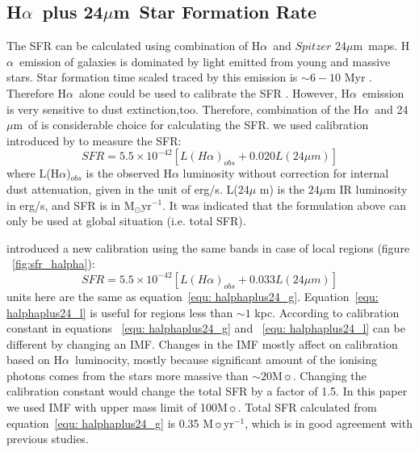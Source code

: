 \documentclass[useAMS,usenatbib]{mn2e}
\newcommand \halpha    {H$\alpha $\ }
\newcommand \um    {$\mu$m\ }
\begin{document}
\subsection{\halpha plus 24\um Star Formation Rate}
\label{sec:sfr_halpha}

The SFR can be calculated using combination of \halpha and $Spitzer$ 24\um maps. \halpha emission of galaxies is dominated by light emitted from young and massive stars. Star formation time scaled traced by this emission is $\sim 6-10$ Myr \citep[e.g.,][]{Kennicutt09, Calzetti12}. Therefore \halpha alone could be used to calibrate the SFR \citep[e.g.,][]{Osterbrock06, Kennicutt09}. However, \halpha emission is very sensitive to dust extinction,too. Therefore, combination of the \halpha and 24\um of is considerable choice for calculating the SFR. we used calibration introduced by \cite{Kennicutt09} to measure the SFR:
\begin{equation}
\label{equ: halphaplus24_g}
SFR = 5.5 \times 10^{-42}[L(H{\alpha})_{obs} + 0.020L(24\mu m)]
\end{equation}
where L(H${\alpha}$)$_{obs}$ is the observed H${\alpha}$ luminosity without correction for internal dust attenuation, given in the unit of erg/s. L(24$\mu$ m) is the $24\mu$m IR luminosity in erg/s, and SFR is in M$_{\odot}$yr$^{-1}$. It was indicated that the formulation above can only be used at global situation (i.e. total SFR).

\cite{Calzetti07} introduced a new calibration using the same bands in case of local regions (figure ~\ref{fig:sfr_halpha}):
\begin{equation}
\label{equ: halphaplus24_l}
SFR = 5.5 \times 10^{-42}[L(H{\alpha})_{obs} + 0.033L(24\mu m)]
\end{equation}
units here are the same as equation~\ref{equ: halphaplus24_g}. Equation~\ref{equ: halphaplus24_l} is useful for regions less than $\sim 1$ kpc. According to  \cite{Calzetti07} calibration constant in equations ~\ref{equ: halphaplus24_g} and ~\ref{equ: halphaplus24_l} can be different by changing an IMF. Changes in the IMF mostly affect on calibration based on \halpha luminocity, mostly because significant amount of the ionising photons comes from the stars more massive than $\sim 20$M$\sun$. Changing the calibration constant would change the total SFR by a factor of 1.5. In this paper we used \cite{Kroupa01} IMF with upper mass limit of 100M$\sun$. Total SFR calculated from equation~\ref{equ: halphaplus24_g} is 0.35 M$\sun$yr$^{-1}$, which is in good agreement with previous studies.
\end{document}
